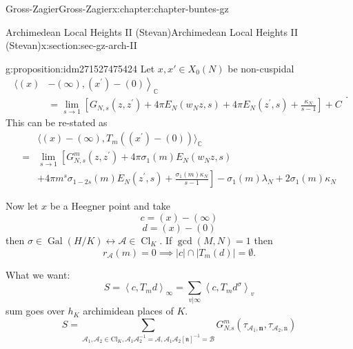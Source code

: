 \documentclass[oneside,10pt,]{book}
\numberwithin{equation}{section}
\newcommand{\pair}[2]{\left\langle #1, #2 \right\rangle}
\DeclareMathOperator{\Cl}{Cl}
\newcommand{\Gal}[2]{\operatorname{Gal}(#1/#2)}
\newcommand{\amp}{&}
\begin{document}
\begin{chapterptx}{Gross-Zagier}{}{Gross-Zagier}{}{}{x:chapter:chapter-buntes-gz}
\begin{sectionptx}{Archimedean Local Heights II (Stevan)}{}{Archimedean Local Heights II (Stevan)}{}{}{x:section:sec-gz-arch-II}
\begin{proposition}{}{}{g:proposition:idm271527475424}
Let \(x,x'\in X_0(N)\) be non-cuspidal%
\begin{equation*}
\begin{aligned}\langle(x)\amp\left.-(\infty),\left(x^{\prime}\right)-(0)\right\rangle_{\mathbb{C}} \\ \amp=\lim _{s \rightarrow 1}\left[G_{N, s}\left(z, z^{\prime}\right)+4 \pi E_{N}\left(w_{N} z, s\right)+4 \pi E_{N}\left(z^{\prime}, s\right)+\frac{\kappa_{N}}{s-1}\right]+C \end{aligned}\text{.}
\end{equation*}
This can be re-stated as%
\begin{equation*}
\begin{aligned}\amp\langle(x)-(\infty), T_{m}\left(\left(x^{\prime}\right)-(0)\right)\rangle_{\mathbb{C}} \\=\amp \lim _{s \rightarrow 1}\left[G_{N, s}^{m}\left(z, z^{\prime}\right)+4 \pi \sigma_{1}(m) E_{N}\left(w_{N} z, s\right)\right.\\ \amp\left.+4 \pi m^{s} \sigma_{1-2 s}(m) E_{N}\left(z^{\prime}, s\right)+\frac{\sigma_{1}(m) \kappa_{N}}{s-1}\right]-\sigma_{1}(m) \lambda_{N}+2 \sigma_{1}(m) \kappa_{N} \end{aligned}
\end{equation*}
%
\end{proposition}
Now let \(x\) be a Heegner point and take%
\begin{equation*}
c= (x)  - (\infty )
\end{equation*}
%
\begin{equation*}
d = (x)-(0)
\end{equation*}
then \(\sigma \in \Gal HK \leftrightarrow \mathscr A\in \Cl_K\). If \(\gcd(M,N) = 1\) then%
\begin{equation*}
r_{\mathscr A} (m ) = 0 \implies |c| \cap |T_m (d)| = \emptyset\text{.}
\end{equation*}
%
\par
What we want:%
\begin{equation*}
S = \pair c {T_md}_\infty  = \sum_{v|\infty } \pair c {T_md^\sigma }_v
\end{equation*}
sum goes over \(h_K\) archimidean places of \(K\).%
\begin{equation*}
S = \sum_{\mathscr{A}_{1}, \mathscr{A}_{2} \in \mathrm{Cl}_{K} , \mathscr{A}_{1} \mathscr{A}_{2}^{-1}=\mathscr{A}, \mathscr{A}_{1} \mathscr{A}_{2}[\mathfrak{n}]^{-1}=\mathscr{B}} G_{N . s}^{m}\left(\tau_{\mathscr{A}_{1}, \mathbf{n}}, \tau_{\mathscr{A}_{2}, \mathrm{n}}\right)
\end{equation*}

\end{sectionptx}
\end{chapterptx}
\end{document}
